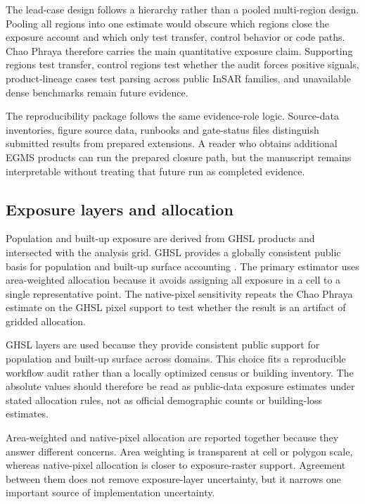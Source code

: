 \documentclass[pdflatex,sn-mathphys-ay]{sn-jnl}
\begin{document}
The lead-case design follows a hierarchy rather than a pooled multi-region design. Pooling all regions into one estimate would obscure which regions close the exposure account and which only test transfer, control behavior or code paths. Chao Phraya therefore carries the main quantitative exposure claim. Supporting regions test transfer, control regions test whether the audit forces positive signals, product-lineage cases test parsing across public InSAR families, and unavailable dense benchmarks remain future evidence.

The reproducibility package follows the same evidence-role logic. Source-data inventories, figure source data, runbooks and gate-status files distinguish submitted results from prepared extensions. A reader who obtains additional EGMS products can run the prepared closure path, but the manuscript remains interpretable without treating that future run as completed evidence.

\subsection{Exposure layers and allocation}

Population and built-up exposure are derived from GHSL products and intersected with the analysis grid. GHSL provides a globally consistent public basis for population and built-up surface accounting \citep{pesaresi2024ghsl}. The primary estimator uses area-weighted allocation because it avoids assigning all exposure in a cell to a single representative point. The native-pixel sensitivity repeats the Chao Phraya estimate on the GHSL pixel support to test whether the result is an artifact of gridded allocation.

GHSL layers are used because they provide consistent public support for population and built-up surface across domains. This choice fits a reproducible workflow audit rather than a locally optimized census or building inventory. The absolute values should therefore be read as public-data exposure estimates under stated allocation rules, not as official demographic counts or building-loss estimates.

Area-weighted and native-pixel allocation are reported together because they answer different concerns. Area weighting is transparent at cell or polygon scale, whereas native-pixel allocation is closer to exposure-raster support. Agreement between them does not remove exposure-layer uncertainty, but it narrows one important source of implementation uncertainty.
\end{document}
